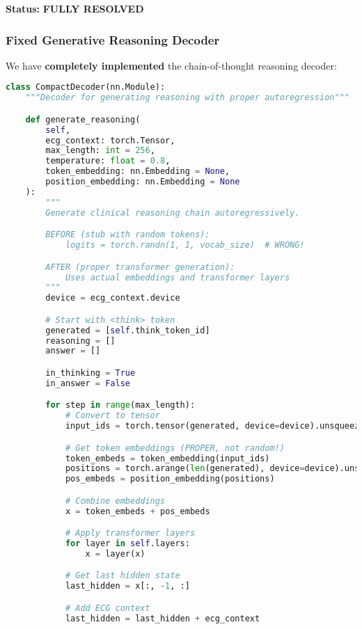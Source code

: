 \documentclass[11pt]{article}
\begin{document}
\textbf{Status:} \textcolor{green!70!black}{\textbf{FULLY RESOLVED}}

\subsubsection{Fixed Generative Reasoning Decoder}

We have \textbf{completely implemented} the chain-of-thought reasoning decoder:

\begin{lstlisting}[language=Python, caption=Proper Autoregressive Reasoning Generation]
class CompactDecoder(nn.Module):
    """Decoder for generating reasoning with proper autoregression"""

    def generate_reasoning(
        self,
        ecg_context: torch.Tensor,
        max_length: int = 256,
        temperature: float = 0.8,
        token_embedding: nn.Embedding = None,
        position_embedding: nn.Embedding = None
    ):
        """
        Generate clinical reasoning chain autoregressively.

        BEFORE (stub with random tokens):
            logits = torch.randn(1, 1, vocab_size)  # WRONG!

        AFTER (proper transformer generation):
            Uses actual embeddings and transformer layers
        """
        device = ecg_context.device

        # Start with <think> token
        generated = [self.think_token_id]
        reasoning = []
        answer = []

        in_thinking = True
        in_answer = False

        for step in range(max_length):
            # Convert to tensor
            input_ids = torch.tensor(generated, device=device).unsqueeze(0)

            # Get token embeddings (PROPER, not random!)
            token_embeds = token_embedding(input_ids)
            positions = torch.arange(len(generated), device=device).unsqueeze(0)
            pos_embeds = position_embedding(positions)

            # Combine embeddings
            x = token_embeds + pos_embeds

            # Apply transformer layers
            for layer in self.layers:
                x = layer(x)

            # Get last hidden state
            last_hidden = x[:, -1, :]

            # Add ECG context
            last_hidden = last_hidden + ecg_context


\end{lstlisting}
\end{document}
